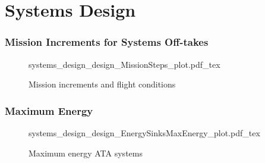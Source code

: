 
\section{Systems Design}
\begin{frame}
 \frametitle{Mission Increments for Systems Off-takes}
     \begin{figure}
     \tiny
     \def\svgwidth{7cm}
     {systems_design_design_MissionSteps_plot.pdf_tex}
         \caption{\scriptsize{Mission increments and flight conditions}}
     \end{figure}
\end{frame}
\begin{frame}
 \frametitle{Maximum Energy}
     \begin{figure}
         \tiny
         \def\svgwidth{10cm}
         {systems_design_design_EnergySinksMaxEnergy_plot.pdf_tex}
         \caption{\scriptsize{Maximum energy ATA systems}}
     \end{figure}
\end{frame}

